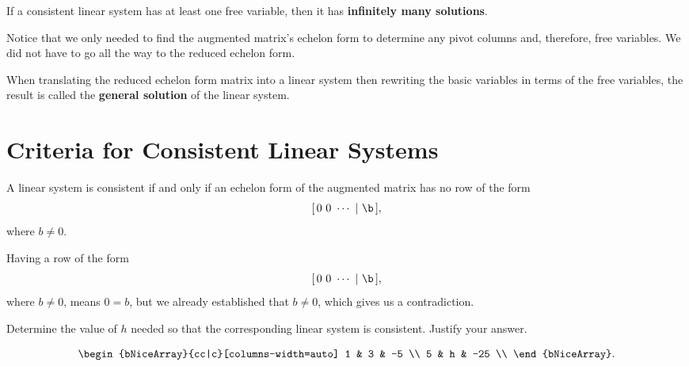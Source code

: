 \begin{purpleframe}
  \label{prpl:infinite_solutions}

    If a consistent linear system has at least one free variable, then it has
    \textbf{infinitely many solutions}.
\end{purpleframe}

\begin{note}
  \label{nte:infinite_solutions}

  Notice that we only needed to find the augmented matrix’s echelon form to
  determine any pivot columns and, therefore, free variables. We did not have
  to go all the way to the reduced echelon form.
\end{note}

\begin{definition}
  \label{def:general_solution}

  When translating the reduced echelon form matrix into a linear system then
  rewriting the basic variables in terms of the free variables, the result is
  called the \textbf{general solution} of the linear system.
\end{definition}


\section{Criteria for Consistent Linear Systems}
\label{sec:criteria_for_consistent_linear_systems}

\begin{theorem}
  \label{thm:existence_and_uniqueness}

  A linear system is consistent if and only if an echelon form of the augmented
  matrix has no row of the form
  \[%
    [\,0~0~\cdots~\vert~\b\,]
  ,\]%
  where $b \ne 0$.
\end{theorem}

Having a row of the form
\[%
  [\,0~0~\cdots~\vert~\b\,]
,\]%
where $b \ne 0$, means $0 = b$, but we already established that $b \ne 0$, which
gives us a contradiction.

\begin{question}
  \label{qst:solve_for_h}

  Determine the value of $h$ needed so that the corresponding linear system is
  consistent. Justify your answer.

  \[%
    \begin{bNiceArray}{cc|c}[columns-width=auto]
      1 & 3 & -5 \\
      5 & h & -25 \\
    \end{bNiceArray}
  .\]%
\end{question}

